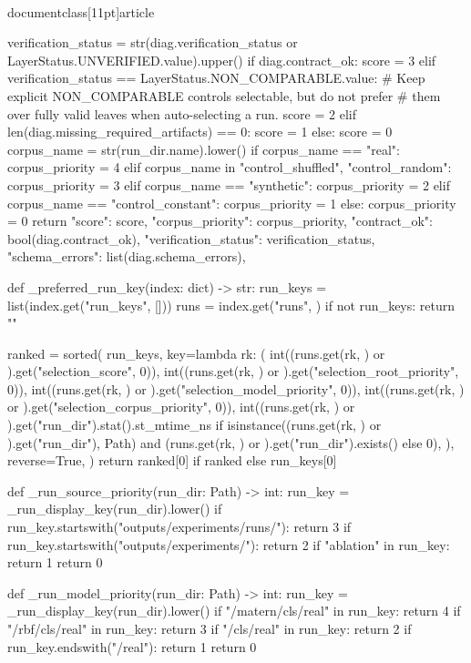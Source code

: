 \\documentclass[11pt]{article}
\begin{document}
\begin{CodeBlock}
{    verification_status = str(diag.verification_status or LayerStatus.UNVERIFIED.value).upper()
    if diag.contract_ok:
        score = 3
    elif verification_status == LayerStatus.NON_COMPARABLE.value:
        # Keep explicit NON_COMPARABLE controls selectable, but do not prefer
        # them over fully valid leaves when auto-selecting a run.
        score = 2
    elif len(diag.missing_required_artifacts) == 0:
        score = 1
    else:
        score = 0
    corpus_name = str(run_dir.name).lower()
    if corpus_name == "real":
        corpus_priority = 4
    elif corpus_name in {"control_shuffled", "control_random"}:
        corpus_priority = 3
    elif corpus_name == "synthetic":
        corpus_priority = 2
    elif corpus_name == "control_constant":
        corpus_priority = 1
    else:
        corpus_priority = 0
    return {
        "score": score,
        "corpus_priority": corpus_priority,
        "contract_ok": bool(diag.contract_ok),
        "verification_status": verification_status,
        "schema_errors": list(diag.schema_errors),
    }


def _preferred_run_key(index: dict) -> str:
    run_keys = list(index.get("run_keys", []))
    runs = index.get("runs", {})
    if not run_keys:
        return ""

    ranked = sorted(
        run_keys,
        key=lambda rk: (
            int((runs.get(rk, {}) or {}).get("selection_score", 0)),
            int((runs.get(rk, {}) or {}).get("selection_root_priority", 0)),
            int((runs.get(rk, {}) or {}).get("selection_model_priority", 0)),
            int((runs.get(rk, {}) or {}).get("selection_corpus_priority", 0)),
            int((runs.get(rk, {}) or {}).get("run_dir").stat().st_mtime_ns if isinstance((runs.get(rk, {}) or {}).get("run_dir"), Path) and (runs.get(rk, {}) or {}).get("run_dir").exists() else 0),
        ),
        reverse=True,
    )
    return ranked[0] if ranked else run_keys[0]


def _run_source_priority(run_dir: Path) -> int:
    run_key = _run_display_key(run_dir).lower()
    if run_key.startswith("outputs/experiments/runs/"):
        return 3
    if run_key.startswith("outputs/experiments/"):
        return 2
    if "ablation" in run_key:
        return 1
    return 0


def _run_model_priority(run_dir: Path) -> int:
    run_key = _run_display_key(run_dir).lower()
    if "/matern/cls/real" in run_key:
        return 4
    if "/rbf/cls/real" in run_key:
        return 3
    if "/cls/real" in run_key:
        return 2
    if run_key.endswith("/real"):
        return 1
    return 0


}
\end{CodeBlock}
\end{document}
